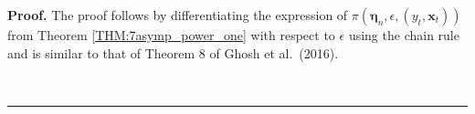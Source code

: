 \documentclass[a4paper]{article}%
\newenvironment{proof}[1][Proof]{\noindent \textbf{#1.} }{\  \rule{0.5em}{0.5em}}
\begin{document}
\begin{proof}
The proof follows by differentiating the expression of $\pi(\boldsymbol{\eta
}_{n},\epsilon,(y_{t},\boldsymbol{x}_{t}))$ from Theorem
\ref{THM:7asymp_power_one} with respect to $\epsilon$ using the chain rule and
is similar to that of Theorem 8 of Ghosh et al.~(2016).

\end{proof}
\end{document}
